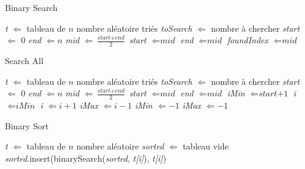 \documentclass[11pt]{extarticle}
\begin{document}
\begin{center}
\begin{algorithm}
\caption{Binary Search}\label{binary_search}
\begin{algorithmic} %
    \State \textit{t} $\Leftarrow $ tableau de $n$ nombre aléatoire triés
    \State \textit{toSearch} $\Leftarrow $ nombre à chercher
    \State \textit{start} $\Leftarrow $ 0
    \State \textit{end} $\Leftarrow n$
    	\State \textit{mid} $\Leftarrow \frac{\textit{start} + \textit{end}}{2}$
			\State \textit{start} $\Leftarrow \textit{mid}$
			\State \textit{end} $\Leftarrow \textit{mid}$
		\Else
			\State \textit{foundIndex} $\Leftarrow \textit{mid}$
		\EndIf
	\EndWhile
\end{algorithmic}
\end{algorithm}

\begin{algorithm}
\caption{Search All}\label{search all}
\begin{algorithmic} %
    \State \textit{t} $\Leftarrow $ tableau de $n$ nombre aléatoire triés
    \State \textit{toSearch} $\Leftarrow $ nombre à chercher
    \State \textit{start} $\Leftarrow $ 0
    \State \textit{end} $\Leftarrow n$
    	\State \textit{mid} $\Leftarrow \frac{\textit{start} + \textit{end}}{2}$
			\State \textit{start} $\Leftarrow \textit{mid}$
		\Else
			\State \textit{end} $\Leftarrow \textit{mid}$	
		\EndIf
	\EndWhile
		\State \textit{iMin} $\Leftarrow \textit{start+1}$
		\State \textit{i} $\Leftarrow \textit{iMin}$
			\State \textit{i} $\Leftarrow \textit{i} + 1$
		\EndWhile
		\State \textit{iMax} $\Leftarrow \textit{i} - 1$
	\Else
		\State \textit{iMin} $\Leftarrow -1$
		\State \textit{iMax} $\Leftarrow -1$
	\EndIf
\end{algorithmic}
\end{algorithm}
\end{center}

\newpage
\begin{center}
\begin{algorithm}
\caption{Binary Sort}\label{binary_sort}
\begin{algorithmic} %
    \State \textit{t} $\Leftarrow $ tableau de $n$ nombre aléatoire
    \State \textit{sorted} $\Leftarrow $ tableau vide
    	\State \textit{sorted}.insert(binarySearch(\textit{sorted}, \textit{t[i]}), \textit{t[i]})
    \EndFor
\end{algorithmic}
\end{algorithm}
\end{center}
\end{document}
